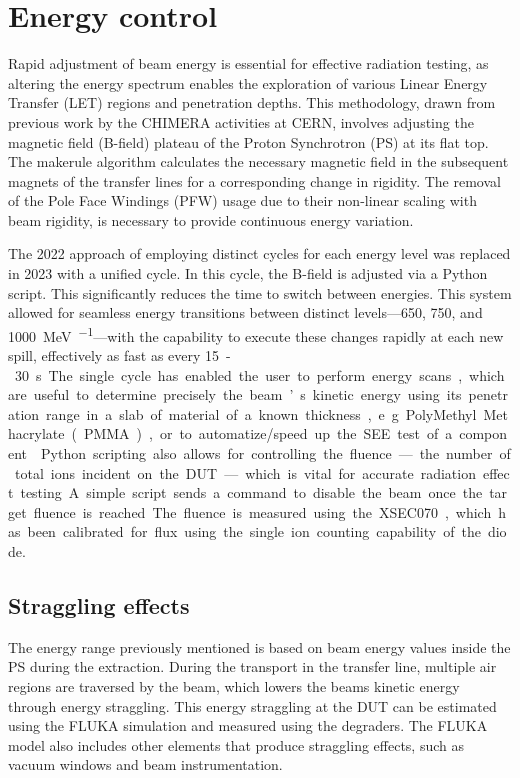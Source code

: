 \documentclass[a4paper,
               biblatex,     %
               ]{jacow}
\begin{document}
\section{Energy control}

Rapid adjustment of beam energy is essential for effective radiation testing, as altering the energy spectrum enables the exploration of various Linear Energy Transfer (LET) regions and penetration depths. This methodology, drawn from previous work by the CHIMERA activities at CERN, involves adjusting the magnetic field (B-field) plateau of the Proton Synchrotron (PS) at its flat top. The makerule algorithm calculates the necessary magnetic field in the subsequent magnets of the transfer lines for a corresponding change in rigidity. The removal of the Pole Face Windings (PFW) usage due to their non-linear scaling with beam rigidity, is necessary to provide continuous energy variation.

The 2022 approach of employing distinct cycles for each energy level was replaced in 2023 with a unified cycle. In this cycle, the B-field is adjusted via a Python script. This significantly reduces the time to switch between energies. This system allowed for seamless energy transitions between distinct levels—\SI{650}{}, \SI{750}{}, and \SI{1000}{\mega\electronvolt\per\nucleon}—with the capability to execute these changes rapidly at each new spill, effectively as fast as every \SI{15}-\SI{30}{\second}.

The single cycle has enabled the user to perform energy scans, which are useful to determine precisely the beam’s kinetic energy using its penetration range in a slab of material of a known thickness, e.g. PolyMethyl Methacrylate (PMMA), or to automatize/speed up the SEE test of a component. \cite{noauthor_hearts_nodate}

Python scripting also allows for controlling the fluence—the number of total ions incident on the DUT—which is vital for accurate radiation effect testing. A simple script sends a command to disable the beam once the target fluence is reached. The fluence is measured using the XSEC070, which has been calibrated for flux using the single ion counting capability of the diode.

\subsection{Straggling effects}
The energy range previously mentioned is based on beam energy values inside the PS during the extraction. During the transport in the transfer line, multiple air regions are traversed by the beam, which lowers the beams kinetic energy through energy straggling. This energy straggling at the DUT can be estimated using the FLUKA \cite{battistoni_overview_2015} simulation and measured using the degraders. The FLUKA model also includes other elements that produce straggling effects, such as vacuum windows and beam instrumentation. 
\end{document}
